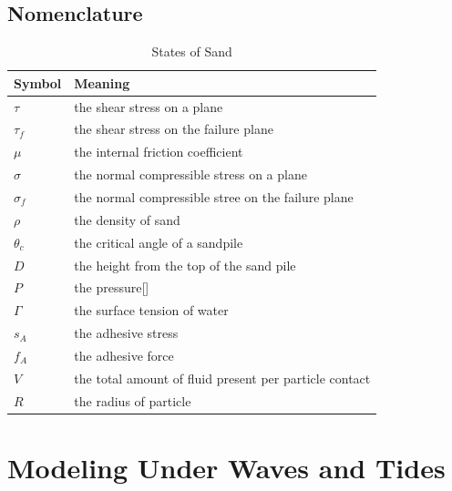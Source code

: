 \documentclass[12pt]{article}
\begin{document}
\subsection{Nomenclature}
\begin{table}[H]
    \caption{States of Sand}
    \vspace{5pt}
    \centering
    \begin{tabular}{p{3cm}p{12cm}}
        \hline
        Symbol     & Meaning                                                \\
        \hline
        $\tau$     & the shear stress on a plane                            \\
        $\tau_f$   & the shear stress on the failure plane                  \\
        $\mu$      & the internal friction coefficient                      \\
        $\sigma$   & the normal compressible stress on a plane              \\
        $\sigma_f$ & the normal compressible stree on the failure plane     \\
        $\rho$     & the density of sand                                    \\
        $\theta_c$ & the critical angle of a sandpile                       \\
        $D$        & the height from the top of the sand pile               \\
        $P$        & the pressure[]                                         \\
        $\Gamma$   & the surface tension of water                           \\
        $s_A$      & the adhesive stress                                    \\
        $f_A$      & the adhesive force                                     \\
        $V$        & the total amount of fluid present per particle contact \\
        $R$        & the radius of particle                                 \\
        \hline
    \end{tabular}
    \label{bs2}
\end{table}


\section{Modeling Under Waves and Tides}
\end{document}
